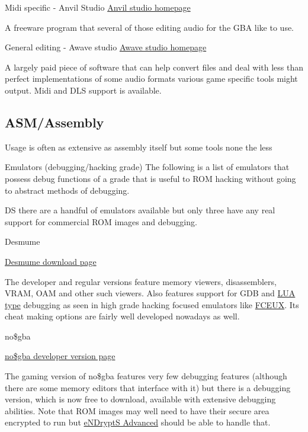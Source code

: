 \documentclass[
]{book}
\begin{document}
Midi specific - Anvil Studio \href{http://www.anvilstudio.com/}{Anvil studio homepage}

A freeware program that several of those editing audio for the GBA like to use.

General editing - Awave studio \href{http://www.fmjsoft.com/awframe.html}{Awave studio homepage}

A largely paid piece of software that can help convert files and deal with less than perfect implementations of some audio formats various game specific tools might output. Midi and DLS support is available.

\hypertarget{asmassembly}{%
\subsection{ASM/Assembly}\label{asmassembly}}

Usage is often as extensive as assembly itself but some tools none the less

Emulators (debugging/hacking grade) The following is a list of emulators that possess debug functions of a grade that is useful to ROM hacking without going to abstract methods of debugging.

DS there are a handful of emulators available but only three have any real support for commercial ROM images and debugging.

Desmume

\href{http://desmume.org/download/}{Desmume download page}

The developer and regular versions feature memory viewers, disassemblers, VRAM, OAM and other such viewers. Also features support for GDB and \href{http://wiki.desmume.org/index.php?title=Faq\#What_is_this_Lua_stuff_I_see.3F}{LUA type} debugging as seen in high grade hacking focused emulators like \href{http://www.fceux.com/web/help/LuaScripting.html}{FCEUX}. Its cheat making options are fairly well developed nowadays as well.

no\$gba

\href{http://problemkaputt.de/gba-dev.htm}{no\$gba developer version page}

The gaming version of no\$gba features very few debugging features (although there are some memory editors that interface with it) but there is a debugging version, which is now free to download, available with extensive debugging abilities. Note that ROM images may well need to have their secure area encrypted to run but \href{http://www.no-intro.org/tools.htm}{eNDryptS Advanced} should be able to handle that.
\end{document}
